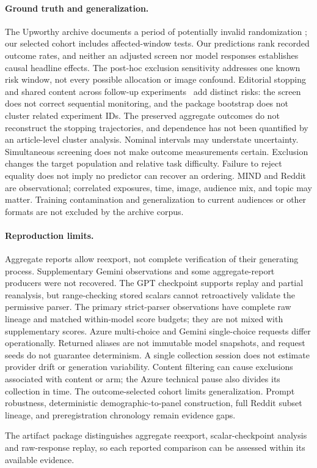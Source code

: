 \paragraph{Ground truth and generalization.}
The Upworthy archive documents a period of potentially invalid randomization
\citep{matias2024correction}; our selected cohort includes affected-window tests. Our predictions
rank recorded outcome rates, and neither an adjusted screen nor model responses establishes
causal headline effects. The post-hoc exclusion sensitivity addresses one known risk window,
not every possible allocation or image confound. Editorial stopping and shared content across
follow-up experiments~\citep{matiasUpworthy} add distinct risks: the screen does not correct
sequential monitoring, and the package bootstrap does not cluster related experiment IDs.
The preserved aggregate outcomes do not reconstruct the stopping trajectories, and dependence
has not been quantified by an article-level cluster analysis. Nominal intervals may understate
uncertainty. Simultaneous screening does not make outcome measurements certain. Exclusion changes the target population and relative task difficulty.
Failure to reject equality does not imply no predictor can recover an ordering.
MIND and Reddit are observational; correlated exposures, time, image, audience mix, and topic
may matter. Training contamination and generalization to current audiences or other formats
are not excluded by the archive corpus.

\paragraph{Reproduction limits.}
Aggregate reports allow reexport, not complete verification of their generating process.
Supplementary Gemini observations and some aggregate-report producers were not recovered. The GPT checkpoint
supports replay and partial reanalysis, but range-checking stored scalars cannot retroactively
validate the permissive parser. The primary strict-parser observations have complete raw lineage and matched within-model score
budgets; they are not mixed with supplementary scores. Azure multi-choice and Gemini single-choice
requests differ operationally. Returned aliases are not immutable model snapshots, and request
seeds do not guarantee determinism. A single collection session does not estimate provider drift
or generation variability. Content filtering can cause exclusions associated with content or arm;
the Azure technical pause also divides its collection in time. The outcome-selected cohort limits generalization.
Prompt robustness, deterministic demographic-to-panel construction, full Reddit subset lineage,
and preregistration chronology remain evidence gaps.

The artifact package distinguishes aggregate reexport, scalar-checkpoint analysis and raw-response
replay, so each reported comparison can be assessed within its available evidence.
